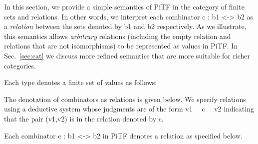 \documentclass{llncs}
\begin{document}
In this section, we provide a simple semantics of {{PiTF}} in the category of
finite sets and relations. In other words, we interpret each combinator 
{{c : b1 <-> b2}} as a \emph{relation} between the sets denoted by {{b1}} and
{{b2}} respectively. As we illustrate, this semantics allows \emph{arbitrary}
relations (including the empty relation and relations that are not
isomorphisms) to be represented as values in {{PiTF}}.  In Sec.~\ref{sec:cat}
we discuss more refined semantics that are more suitable for richer
categories.

\begin{definition}
\label{chx:def:denot}
Each type denotes a finite set of values as follows:
\end{definition}

The denotation of combinators as relations is given below. We specify
relations using a deductive system whose judgments are of the form 
{{ v1 ~~c~~ v2 }} indicating that the pair {{(v1,v2)}} is in the relation 
denoted by {{c}}.

\begin{definition}
\label{def:relational-PiTF}
Each combinator {{c : b1 <-> b2}} in {{PiTF}} denotes a relation
as specified below. 
%
%
%
%
%
%
%
%
%
%
%
%
\end{definition}
\end{document}
